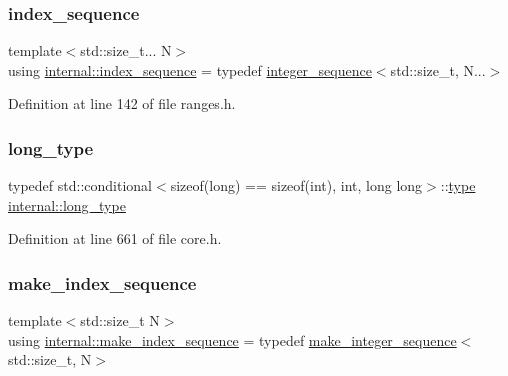 \subsubsection{\texorpdfstring{index\+\_\+sequence}{index\_sequence}}
{\footnotesize\ttfamily template$<$std\+::size\+\_\+t... N$>$ \\
using \hyperlink{namespaceinternal_a934b7952794e1164012436fcd82abb6b}{internal\+::index\+\_\+sequence} = typedef \hyperlink{structinternal_1_1integer__sequence}{integer\+\_\+sequence}$<$std\+::size\+\_\+t, N...$>$}



Definition at line 142 of file ranges.\+h.

\mbox{\label{namespaceinternal_a0e92ff50bf0626d16bd3c814946ecd3d}} 
\subsubsection{\texorpdfstring{long\+\_\+type}{long\_type}}
{\footnotesize\ttfamily typedef std\+::conditional$<$sizeof(long) == sizeof(int), int, long long$>$\+::\hyperlink{namespaceinternal_a8661864098ac0acff9a6dd7e66f59038}{type} \hyperlink{namespaceinternal_a0e92ff50bf0626d16bd3c814946ecd3d}{internal\+::long\+\_\+type}}



Definition at line 661 of file core.\+h.

\mbox{\label{namespaceinternal_ac3a4f2187fce6a6dfd5576bd311c9876}} 
\subsubsection{\texorpdfstring{make\+\_\+index\+\_\+sequence}{make\_index\_sequence}}
{\footnotesize\ttfamily template$<$std\+::size\+\_\+t N$>$ \\
using \hyperlink{namespaceinternal_ac3a4f2187fce6a6dfd5576bd311c9876}{internal\+::make\+\_\+index\+\_\+sequence} = typedef \hyperlink{structinternal_1_1make__integer__sequence}{make\+\_\+integer\+\_\+sequence}$<$std\+::size\+\_\+t, N$>$}



